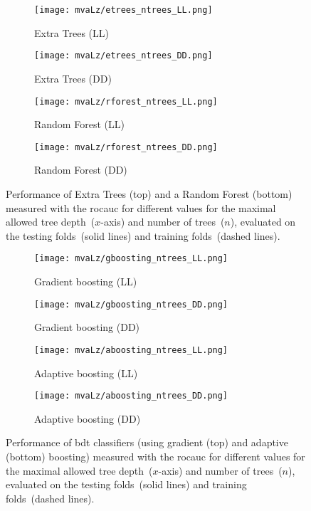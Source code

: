 \begin{figure}[htbp]
    \centering
    \begin{subfigure}[b]{.49\textwidth}
        \centering
        \texttt{[image: mvaLz/etrees\_ntrees\_LL.png]}
        \caption{Extra Trees (\gls{LL})}
    \end{subfigure}
    \begin{subfigure}[b]{.49\textwidth}
        \centering
        \texttt{[image: mvaLz/etrees\_ntrees\_DD.png]}
        \caption{Extra Trees (\gls{DD})}
    \end{subfigure}
    \par\bigskip 
    \begin{subfigure}[b]{.49\textwidth}
        \centering
        \texttt{[image: mvaLz/rforest\_ntrees\_LL.png]}
        \caption{Random Forest (\gls{LL})}
    \end{subfigure}
    \begin{subfigure}[b]{.49\textwidth}
        \centering
        \texttt{[image: mvaLz/rforest\_ntrees\_DD.png]}
        \caption{Random Forest (\gls{DD})}
    \end{subfigure}
    \caption{Performance of Extra Trees (top) and a Random Forest (bottom) measured with the \gls{rocauc} for different values for the maximal allowed tree depth~($x$-axis) and number of trees~($n$), evaluated on the testing folds~(solid lines) and training folds~(dashed lines).}
    \label{fig:mvaLz_forest_hyperparams}
\end{figure}

\begin{figure}[htbp]
    \centering
    \begin{subfigure}[b]{.49\textwidth}
        \centering
        \texttt{[image: mvaLz/gboosting\_ntrees\_LL.png]}
        \caption{Gradient boosting (\gls{LL})}
    \end{subfigure}
    \begin{subfigure}[b]{.49\textwidth}
        \centering
        \texttt{[image: mvaLz/gboosting\_ntrees\_DD.png]}
        \caption{Gradient boosting (\gls{DD})}
    \end{subfigure}
    \par\bigskip 
    \begin{subfigure}[b]{.49\textwidth}
        \centering
        \texttt{[image: mvaLz/aboosting\_ntrees\_LL.png]}
        \caption{Adaptive boosting (\gls{LL})}
    \end{subfigure}
    \begin{subfigure}[b]{.49\textwidth}
        \centering
        \texttt{[image: mvaLz/aboosting\_ntrees\_DD.png]}
        \caption{Adaptive boosting (\gls{DD})}
    \end{subfigure}
    \caption{Performance of \gls{bdt} classifiers (using gradient (top) and adaptive (bottom) boosting) measured with the \gls{rocauc} for different values for the maximal allowed tree depth~($x$-axis) and number of trees~($n$), evaluated on the testing folds~(solid lines) and training folds~(dashed lines).}
    \label{fig:mvaLz_bdt_hyperparams}
\end{figure}

